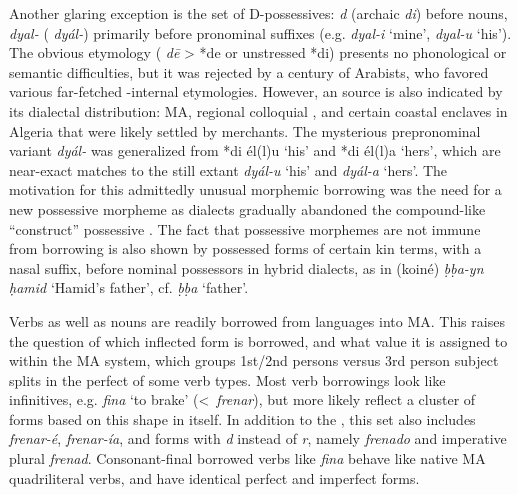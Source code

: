 \documentclass[output=paper]{langsci/langscibook}
\begin{document}
Another glaring exception is the set of D-possessives: \textit{d} (archaic \textit{di}) before nouns, \textit{dyal-} ( \textit{dyál-}) primarily before pronominal suffixes (e.g. \textit{dyal-i} ‘mine’, \textit{dyal-u} ‘his’). The obvious etymology ( \textit{dē} >  *de or unstressed *di) presents no phonological or semantic difficulties, but it was rejected by a century of  Arabists, who favored various far-fetched -internal etymologies. However, an  source is also indicated by its dialectal distribution:  MA, regional colloquial  , and certain coastal enclaves in Algeria that were likely settled by  merchants. The mysterious prepronominal variant \textit{dyál-} was generalized from  *di él(l)u ‘his’ and  *di él(l)a ‘hers’, which are near-exact matches to the still extant  \textit{dyál-u} ‘his’ and \textit{dyál-a} ‘hers’. The motivation for this admittedly unusual morphemic borrowing was the need for a new possessive morpheme as  dialects gradually abandoned the compound-like  “construct” possessive \citep{Heath2015}. The fact that possessive morphemes are not immune from borrowing is also shown by possessed forms of certain kin terms, with a  nasal suffix, before nominal possessors in hybrid dialects, as in (koiné) \textit{ḅḅa-yn} \textit{ḥamid} ‘Hamid’s father’, cf. \textit{ḅḅa} ‘father’. 

Verbs as well as nouns are readily borrowed from  languages into MA. This raises the question of which  inflected form is borrowed, and what value it is assigned to within the MA  system, which groups 1st/2nd persons versus 3rd person subject splits in the perfect of some verb types. Most  verb borrowings look like  infinitives, e.g. \textit{f{\R}ina{\R}} ‘to brake’ (<~\textit{frenar}), but more likely reflect a cluster of forms based on this  shape in  itself. In addition to the , this set also includes  \textit{frenar-é},  \textit{frenar-ía}, and forms with \textit{d} instead of \textit{r}, namely  \textit{frenado} and imperative plural \textit{frenad}. Consonant-final borrowed verbs like \textit{f{\R}ina{\R}} behave like native MA quadriliteral verbs, and have identical perfect and imperfect forms. 
\end{document}
